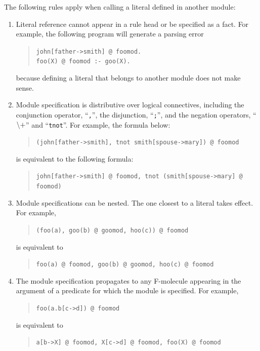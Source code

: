 \documentclass[11pt]{article}
\newcommand{\NAF}{{$\tt\backslash +$}\xspace}
\begin{document}
The following rules apply when calling a literal defined in another module:
\begin{enumerate}
\item Literal reference cannot appear in a rule head or be specified as
  a fact. For example, the following program will generate
  a parsing error
  \begin{quote}
    \verb|john[father->smith] @ foomod.| \\
    \verb|foo(X) @ foomod :- goo(X).|
  \end{quote}
  because defining a literal that belongs to another module does not make
  sense.
  
\item Module specification is distributive over logical connectives,
  including the conjunction operator, ``\verb|,|'', the disjunction,
  ``\verb|;|'', and the negation operators, ``\NAF'' and
  ``\verb|tnot|''. For example, the formula below:
  \begin{quote}
    \verb|(john[father->smith], tnot smith[spouse->mary]) @ foomod|
  \end{quote}
  is equivalent to the following formula:
  \begin{quote}
    \verb|john[father->smith] @ foomod, tnot (smith[spouse->mary] @ foomod)|
  \end{quote}

\item Module specifications can be nested. The one closest to a literal
  takes effect. For example,
  \begin{quote}
    \verb|(foo(a), goo(b) @ goomod, hoo(c)) @ foomod|
  \end{quote}
  is equivalent to
  \begin{quote}
    \verb|foo(a) @ foomod, goo(b) @ goomod, hoo(c) @ foomod|
  \end{quote}
  
\item The module specification propagates to any F-molecule appearing
  in the argument of a predicate for which the module is
  specified. For example,
  \begin{quote}
    \verb|foo(a.b[c->d]) @ foomod|
  \end{quote}
  is equivalent to
  \begin{quote}
    \verb|a[b->X] @ foomod, X[c->d] @ foomod, foo(X) @ foomod|
  \end{quote}
  

\end{enumerate}
\end{document}

